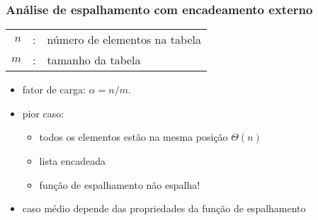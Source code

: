 \documentclass{beamer}
\begin{document}
\begin{frame}

  \frametitle{Análise de espalhamento com encadeamento externo}


  \begin{center}
    \begin{tabular}{rcl}
      $n$ & : & número de elementos na tabela \\
      $m$ & : & tamanho da tabela
    \end{tabular}
  \end{center}

  \begin{itemize}

  \item \alert{fator de carga}: $\alpha = n / m$.


  \item pior caso: 

    \begin{itemize}

      \item todos os elementos estão na mesma posição $\Theta(n)$

      \item lista encadeada

      \item função de espalhamento \alert{não} espalha!

    \end{itemize}


  \item caso médio depende das propriedades da função de espalhamento

  \end{itemize}

\end{frame}
\end{document}
